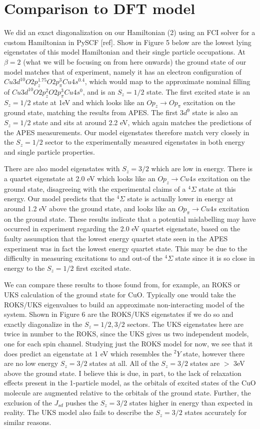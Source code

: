 \documentclass{article}
\begin{document}
\section{Comparison to DFT model}
We did an exact diagonalization on our Hamiltonian (2) using an FCI solver for a custom Hamiltonian in PySCF [ref]. Show in Figure 5 below are the lowest lying eigenstates of this model Hamiltonian and their single particle occupations. At $\beta=2$ (what we will be focusing on from here onwards) the ground state of our model matches that of experiment, namely it has an electron configuration of $Cu 3d^{10} O 2p_z^{1.75} O 2p_\pi^3 Cu 4s^{0.4}$, which would map to the approximate nominal filling of $Cu 3d^{10} O 2p_z^{2} O 2p_\pi^3 Cu 4s^{0}$, and is an $S_z=1/2$ state. The first excited state is an $S_z=1/2$ state at 1eV and which looks like an $O p_z \rightarrow O p_\pi$ excitation on the ground state, matching the results from APES. The first $3d^9$ state is also an $S_z=1/2$ state and sits at around 2.2 eV, which again matches the predictions of the APES measurements. Our model eigenstates therefore match very closely in the $S_z=1/2$ sector to the experimentally measured eigenstates in both energy and single particle properties.

There are also model eigenstates with $S_z=3/2$ which are low in energy. There is a quartet eigenstate at 2.0 eV which looks like an $O p_z \rightarrow Cu 4s$ excitation on the ground state, disagreeing with the experimental claims of a $^4\Sigma$ state at this energy. Our model predicts that the $^4\Sigma$ state is actually lower in energy at around 1.2 eV above the ground state, and looks like an $O p_\pi \rightarrow Cu 4s$ excitation on the ground state. These results indicate that a potential mislabelling may have occurred in experiment regarding the 2.0 eV quartet eigenstate, based on the faulty assumption that the lowest energy quartet state seen in the APES experiment was in fact the lowest energy quartet state. This may be due to the difficulty in measuring excitations to and out-of the $^4\Sigma$ state since it is so close in energy to the $S_z=1/2$ first excited state.

We can compare these results to those found from, for example, an ROKS or UKS calculation of the ground state for CuO. Typically one would take the ROKS/UKS eigenvalues to build an approximate non-interacting model of the system. Shown in Figure 6 are the ROKS/UKS eigenstates if we do so and exactly diagonalize in the $S_z=1/2,3/2$ sectors. The UKS eigenstates here are twice in number to the ROKS, since the UKS gives us two independent models, one for each spin channel. Studying just the ROKS model for now, we see that it does predict an eigenstate at 1 eV which resembles the $^2Y$ state, however there are no low energy $S_z=3/2$ states at all. All of the $S_z=3/2$ states are $>$ 3eV above the ground state. I believe this is due, in part, to the lack of relaxation effects present in the 1-particle model, as the orbitals of excited states of the CuO molecule are augmented relative to the orbitals of the ground state. Further, the exclusion of the $J_{sd}$ pushes the $S_z=3/2$ states higher in energy than expected in reality. The UKS model also fails to describe the $S_z=3/2$ states accurately for similar reasons.
\end{document}
